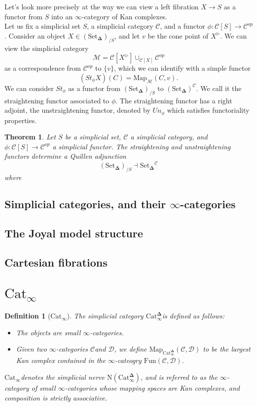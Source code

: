 \documentclass{amsart}
\newcommand{\8}{\ensuremath{\infty}}
\newcommand{\C}{\ensuremath{\mathscr{C}}}
\newcommand{\D}{\ensuremath{\mathscr{D}}}
\newcommand{\SSet}{\ensuremath{\text{Set}_{\boldsymbol{\Delta}}}}
\newcommand{\Catinfdel}{\ensuremath{\text{Cat}^{\boldsymbol{\Delta}}_{\infty}}}
\newcommand{\Catinf}{\ensuremath{\text{Cat}_{\infty}}}
\newcommand{\Map}{\ensuremath{\text{Map}}}
\newcommand{\Fun}{\ensuremath{\text{Fun}}}
\newtheorem{definition}{Definition}
\newtheorem{theorem}{Theorem}
\begin{document}
Let's look more precisely at the way we can view a left fibration $X\rightarrow S$ as a functor from $S$ into an $\8$-category of Kan complexes. \\
Let us fix a simplicial set $S$, a simplicial category $\mathcal{C}$, and a functor $\phi:\mathscr{C}[S]\rightarrow \mathcal{C}^{op}$. Consider an object $X\in(\SSet)_{/S}$, and let $v$ be the cone point of $X^{\triangleright}$. We can view the simplicial category
\[\mathcal{M} = \mathscr{C}[X^{\triangleright}]\displaystyle \cup_{\mathscr{C}[X]}\mathcal{C}^{op}\] as a correspondence from $\mathcal{C}^{op}$ to $\{v\}$, which we can identify with a simple functor
\[(St_\phi X)(C)=\text{Map}_\mathcal{M}(C,v).\]
We can consider $St_\phi$ as a functor from $(\SSet)_{/S}$ to $(\SSet)^\mathcal{C}$. We call it the straightening functor associated to $\phi$.
The straightening functor has a right adjoint, the unstraightening functor, denoted by $Un_\phi$ which satisfies functoriality properties.

\begin{theorem}
  Let $S$ be a simplicial set, $\mathcal{C}$ a simplicial category, and $\phi:\mathscr{C}[S]\rightarrow\mathcal{C}^{op}$ a simplicial functor. The straightening and unstraightening functors determine a Quillen adjunction
  \[(\SSet)_{/S}\dashv \SSet^\mathcal{C}\]
  where
\end{theorem}


\subsection{Simplicial categories, and their \texorpdfstring{$\8$-categories}{∞-categories}}
\subsection{The Joyal model structure}
\subsection{Cartesian fibrations}

\section{\texorpdfstring{$\text{Cat}_\8$}{Cat∞}}

\begin{definition}[\Catinf]
  The simplicial category \Catinfdel is defined as follows:
  \begin{itemize}
    \item The objects are small \8-categories.
    \item Given two \8-categories \C and \D, we define $\Map_{\Catinfdel}(\C, \D)$ to be the largest Kan complex contained in the \8-cateogry $\Fun(\C, \D)$.
  \end{itemize}

  \Catinf denotes the simplicial nerve $\text{N}(\Catinfdel)$, and is referred to as the \8-category of small \8-categories whose mapping spaces are Kan complexes, and composition is strictly associative.
\end{definition}
\end{document}
